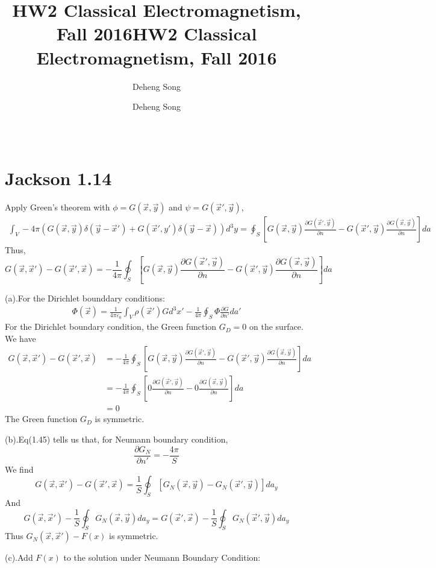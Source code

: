 \documentclass{article}
\title{HW2 Classical Electromagnetism, Fall 2016}
\author{Deheng Song}
\date{\ }
\begin{document}
\title{HW2 Classical Electromagnetism, Fall 2016}
\author{Deheng Song}
\date{\ }
\maketitle
\section*{Jackson 1.14}
Apply Green's theorem with $\phi=G(\vec x,\vec y)$ and $\psi=G(\vec x', \vec y)$,
\begin{align*}
  \int_V-4\pi(G(\vec x,\vec y)\delta(\vec y-\vec x')+G(\vec x',y')\delta(\vec y-\vec x))d^3y=\oint_S[G(\vec x,\vec y)\frac{\partial G(\vec x',\vec y)}{\partial n}-G(\vec x',\vec y)\frac{\partial G(\vec x,\vec y)}{\partial n}]da
\end{align*}
Thus,
\[\boxed{ G(\vec x,\vec x')-G(\vec x', \vec x)=-\frac{1}{4\pi}\oint_S[G(\vec x,\vec y)\frac{\partial G(\vec x',\vec y)}{\partial n}-G(\vec x',\vec y)\frac{\partial G(\vec x,\vec y)}{\partial n}]da} \]\par
(a).For the Dirichlet bounddary conditions:
\begin{align*}
  \Phi(\vec x)=\frac{1}{4\pi\varepsilon_0}\int_V\rho(\vec x')Gd^3x'-\frac{1}{4\pi}\oint_S \Phi\frac{\partial G}{\partial n'}da'
\end{align*}
For the Dirichlet boundary condition, the Green function $G_D=0$ on the surface. We have
\begin{align*}
  G(\vec x,\vec x')-G(\vec x', \vec x)&=-\frac{1}{4\pi}\oint_S[G(\vec x,\vec y)\frac{\partial G(\vec x',\vec y)}{\partial n}-G(\vec x',\vec y)\frac{\partial G(\vec x,\vec y)}{\partial n}]da\\
                                      &=-\frac{1}{4\pi}\oint_S[0\frac{\partial G(\vec x',\vec y)}{\partial n}-0\frac{\partial G(\vec x,\vec y)}{\partial n}]da\\
                                      &=0
\end{align*}
The Green function $G_D$ is symmetric.\par
(b).Eq(1.45) tells us that, for Neumann boundary condition,
\[ \frac{\partial G_N}{\partial n'}=-\frac{4\pi}{S} \]
We find
\[ G(\vec x,\vec x')-G(\vec x',\vec x)=\frac{1}{S}\oint_S[G_N(\vec x,\vec y)-G_N(\vec x',\vec y)]da_y \]
And\[ G(\vec x,\vec x')-\frac{1}{S}\oint_S G_N(\vec x,\vec y)da_y=G(\vec x',\vec x)-
  \frac{1}{S}\oint_S G_N(\vec x',\vec y)da_y
\]
Thus $G_N(\vec x,\vec x')-F(x)$ is symmetric.\par
(c).Add $F(x)$ to the solution under Neumann Boundary Condition:
\end{document}
